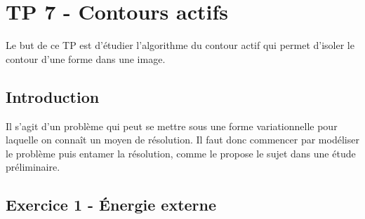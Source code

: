 \documentclass{article}
\begin{document}
\section{TP 7 - Contours actifs}
Le but de ce TP est d'étudier l'algorithme du contour actif qui permet d'isoler le contour d'une forme dans une image.

\subsection{Introduction}
Il s'agit d'un problème qui peut se mettre sous une forme variationnelle pour laquelle on connaît un moyen de résolution. Il faut donc commencer par modéliser le problème puis entamer la résolution, comme le propose le sujet dans une étude préliminaire.

\subsection{Exercice 1 - Énergie externe}
\end{document}
